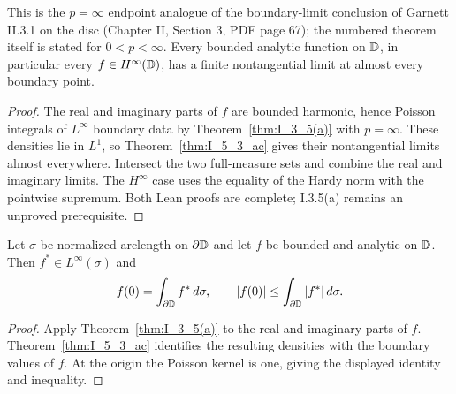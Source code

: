 \begin{corollary}[II.3.1, $p=\infty$: boundary values on the disc]
  \label{cor:II_3_1(p=∞)}
  \leanok
  This is the $p=\infty$ endpoint analogue of the boundary-limit conclusion of
  Garnett II.3.1 on the disc (Chapter II, Section 3, PDF page 67); the numbered
  theorem itself is stated for $0<p<\infty$.
  Every bounded analytic function on $\mathbb{D}$, in particular every $f\in H^\infty(\mathbb{D})$,
  has a finite nontangential limit at almost every boundary point.
  \begin{proof}
    \leanok
    The real and imaginary parts of $f$ are bounded harmonic, hence Poisson
    integrals of $L^\infty$ boundary data by Theorem~\ref{thm:I_3_5(a)} with
    $p=\infty$. These densities lie in $L^1$, so Theorem~\ref{thm:I_5_3_ac}
    gives their nontangential limits almost everywhere. Intersect the two
    full-measure sets and combine the real and imaginary limits.
    The $H^\infty$ case uses the equality of the Hardy norm with the pointwise supremum.
    Both Lean proofs are complete; I.3.5(a) remains an unproved prerequisite.
  \end{proof}
\end{corollary}

\begin{corollary}[Garnett II.3.2, $p=\infty$: Poisson representation on the disc]
  \label{cor:II_3_2(p=∞)}
  \leanok
  Let $\sigma$ be normalized arclength on $\partial\mathbb{D}$ and let $f$ be bounded
  and analytic on $\mathbb{D}$. Then $f^*\in L^\infty(\sigma)$ and
  \[
    f(0)=\int_{\partial\mathbb{D}}f^*\,d\sigma,\qquad
    |f(0)|\le\int_{\partial\mathbb{D}}|f^*|\,d\sigma.
  \]
  \begin{proof}
    \leanok
    Apply Theorem~\ref{thm:I_3_5(a)} to the real and imaginary parts of $f$.
    Theorem~\ref{thm:I_5_3_ac} identifies the resulting densities with the
    boundary values of $f$. At the origin the Poisson kernel is one, giving
    the displayed identity and inequality.
  \end{proof}
\end{corollary}

